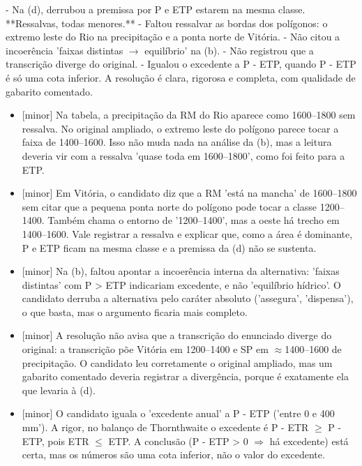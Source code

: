 \documentclass{article}%
\begin{document}
{-} Na (d), derrubou a premissa por P e ETP estarem na mesma classe.\newline%
\newline%
**Ressalvas, todas menores.**\newline%
{-} Faltou ressalvar as bordas dos polígonos: o extremo leste do Rio na precipitação e a ponta norte de Vitória.\newline%
{-} Não citou a incoerência 'faixas distintas $\to$ equilíbrio' na (b).\newline%
{-} Não registrou que a transcrição diverge do original.\newline%
{-} Igualou o excedente a P - ETP, quando P - ETP é só uma cota inferior.\newline%
\newline%
A resolução é clara, rigorosa e completa, com qualidade de gabarito comentado.%
\begin{itemize}%
\item%
{[}minor{]} Na tabela, a precipitação da RM do Rio aparece como 1600--1800 sem ressalva. No original ampliado, o extremo leste do polígono parece tocar a faixa de 1400--1600. Isso não muda nada na análise da (b), mas a leitura deveria vir com a ressalva 'quase toda em 1600--1800', como foi feito para a ETP.%
\item%
{[}minor{]} Em Vitória, o candidato diz que a RM 'está na mancha' de 1600--1800 sem citar que a pequena ponta norte do polígono pode tocar a classe 1200--1400. Também chama o entorno de '1200--1400', mas a oeste há trecho em 1400--1600. Vale registrar a ressalva e explicar que, como a área é dominante, P e ETP ficam na mesma classe e a premissa da (d) não se sustenta.%
\item%
{[}minor{]} Na (b), faltou apontar a incoerência interna da alternativa: 'faixas distintas' com P > ETP indicariam excedente, e não 'equilíbrio hídrico'. O candidato derruba a alternativa pelo caráter absoluto ('assegura', 'dispensa'), o que basta, mas o argumento ficaria mais completo.%
\item%
{[}minor{]} A resolução não avisa que a transcrição do enunciado diverge do original: a transcrição põe Vitória em 1200--1400 e SP em $\approx$1400--1600 de precipitação. O candidato leu corretamente o original ampliado, mas um gabarito comentado deveria registrar a divergência, porque é exatamente ela que levaria à (d).%
\item%
{[}minor{]} O candidato iguala o 'excedente anual' a P - ETP ('entre 0 e 400 mm'). A rigor, no balanço de Thornthwaite o excedente é P - ETR $\geq$ P - ETP, pois ETR $\leq$ ETP. A conclusão (P - ETP > 0 $\Rightarrow$ há excedente) está certa, mas os números são uma cota inferior, não o valor do excedente.%
\end{itemize}%
\end{document}
